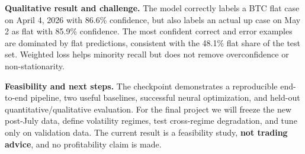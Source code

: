 \documentclass[final]{article}
\newcommand{\smallhead}[1]{\vspace{0.25em}\noindent\textbf{#1}}
\begin{document}
\smallhead{Qualitative result and challenge.}
The model correctly labels a BTC flat case on April 4, 2026 with 86.6\% confidence, but also labels an
actual up case on May 2 as flat with 85.9\% confidence. The most confident correct and error examples
are dominated by flat predictions, consistent with the 48.1\% flat share of the test set. Weighted loss
helps minority recall but does not remove overconfidence or non-stationarity.

\smallhead{Feasibility and next steps.}
The checkpoint demonstrates a reproducible end-to-end pipeline, two useful baselines, successful
neural optimization, and held-out quantitative/qualitative evaluation. For the final project we will
freeze the new post-July data, define volatility regimes, test cross-regime degradation, and tune only
on validation data. The current result is a feasibility study, \textbf{not trading advice}, and no
profitability claim is made.

\clearpage


\end{document}
